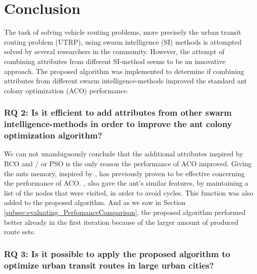 \section{Conclusion}



The task of solving vehicle routing problems, more precisely the urban transit routing problem (UTRP), using swarm intelligence (SI) methods is attempted solved by several researchers in the community. However, the attempt of combining attributes from different SI-method seems to be an innovative approach. The proposed algorithm was implemented to determine if combining attributes from different swarm intelligence-methods improved the standard ant colony optimization (ACO) performance. %


\subsubsection*{RQ 2: Is it efficient to add attributes from other swarm intelligence-methods in order to improve the ant colony optimization algorithm?}

We can not unambiguously conclude that the additional attributes inspired by BCO and / or PSO is the only reason the performance of ACO improved. Giving the ants memory, inspired by \citet{dorigo96}, has previously proven to be effective concerning the performance of ACO. \citet{sedighpour14}, \citet{poorzahedy11} \citet{salehinejad10} also gave the ant's similar features, by maintaining a list of the nodes that were visited, in order to avoid cycles. This function was also added to the proposed algorithm. And as we saw in Section \vref{subsec:evaluating_PerfomanceComparison}, the proposed algorithm performed better already in the first iteration because of the larger amount of produced route sets.

\subsubsection*{RQ 3: Is it possible to apply the proposed algorithm to optimize urban transit routes in large urban cities?}

